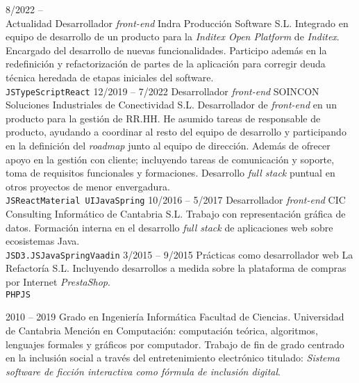 \documentclass[9pt]{developercv} %
\begin{document}
\begin{entrylist}
	\entry
		{8/2022 --\\ Actualidad}
		{Desarrollador \emph{front-end}}
		{Indra Producción Software S.L.}
		{Integrado en equipo de desarrollo de un producto para la \emph{Inditex Open Platform} de \emph{Inditex}. Encargado del desarrollo de nuevas funcionalidades. Participo además en la redefinición y refactorización de partes de la aplicación para corregir deuda técnica heredada de etapas iniciales del software.\\ \texttt{JS}\slashsep\texttt{TypeScript}\slashsep\texttt{React}}
	\entry
		{12/2019 -- 7/2022}
		{Desarrollador \emph{front-end}}
		{SOINCON Soluciones Industriales de Conectividad S.L.}
		{Desarrollador de \emph{front-end} en un producto para la gestión de RR.HH. He asumido tareas de responsable de producto, ayudando a coordinar al resto del equipo de desarrollo y participando en la definición del \emph{roadmap} junto al equipo de dirección. Además de ofrecer apoyo en la gestión con cliente; incluyendo tareas de comunicación y soporte, toma de requisitos funcionales y formaciones. Desarrollo \emph{full stack} puntual en otros proyectos de menor envergadura.\\ \texttt{JS}\slashsep\texttt{React}\slashsep\texttt{Material UI}\slashsep\texttt{Java}\slashsep\texttt{Spring}}
	\entry
		{10/2016 -- 5/2017}
		{Desarrollador \emph{front-end}}
		{CIC Consulting Informático de Cantabria S.L.}
		{Trabajo con representación gráfica de datos. Formación interna en el desarrollo \emph{full stack} de aplicaciones web sobre ecosistemas Java.\\ \texttt{JS}\slashsep\texttt{D3.JS}\slashsep\texttt{Java}\slashsep\texttt{Spring}\slashsep\texttt{Vaadin}}
	\entry
		{3/2015 -- 9/2015}
		{Prácticas como desarrollador web}
		{La Refactoría S.L.}
		{Incluyendo desarrollos a medida sobre la plataforma de compras por Internet \emph{PrestaShop}.\\ \texttt{PHP}\slashsep\texttt{JS}}
\end{entrylist}

%
%


\begin{entrylist}
	\entry
		{2010 -- 2019}
		{Grado en Ingeniería Informática}
		{Facultad de Ciencias. Universidad de Cantabria}
		{Mención en Computación: computación teórica, algoritmos, lenguajes formales y gráficos por computador. Trabajo de fin de grado centrado en la inclusión social a través del entretenimiento electrónico titulado: \emph{Sistema software de ficción interactiva como fórmula de inclusión digital}.}
\end{entrylist}
\end{document}
